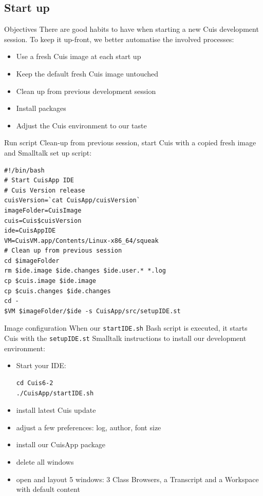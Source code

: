 \documentclass{beamer}
\begin{document}
\subsection{Start up }
\begin{frame}[fragile]{Objectives}
  There are good habits to have when starting a new Cuis development
  session. To keep it up-front, we better automatise the involved
  processes:

  \begin{itemize}
  \item Use a fresh Cuis image at each start up
  \item Keep the default fresh Cuis image untouched
  \item Clean up from previous development session
  \item Install packages
  \item Adjust the Cuis environment to our taste
  \end{itemize}
\end{frame}
%
\begin{frame}[fragile]{Run script}
  \fontsize{10pt}{12pt}\selectfont Clean-up from previous session,
  start Cuis with a copied fresh image and Smalltalk set up script:
  \begin{verbatim}
#!/bin/bash
# Start CuisApp IDE
# Cuis Version release
cuisVersion=`cat CuisApp/cuisVersion`
imageFolder=CuisImage
cuis=Cuis$cuisVersion
ide=CuisAppIDE
VM=CuisVM.app/Contents/Linux-x86_64/squeak
# Clean up from previous session
cd $imageFolder
rm $ide.image $ide.changes $ide.user.* *.log
cp $cuis.image $ide.image
cp $cuis.changes $ide.changes
cd -
$VM $imageFolder/$ide -s CuisApp/src/setupIDE.st
 \end{verbatim}
\end{frame}
%
\begin{frame}[fragile]{Image configuration}
  When our \texttt{startIDE.sh} Bash script is executed, it starts
  Cuis with the \texttt{setupIDE.st} Smalltalk instructions to install
  our development environment:
  \begin{itemize}
  \item Start your IDE:
\begin{verbatim}
cd Cuis6-2
./CuisApp/startIDE.sh
\end{verbatim}
  \item install latest Cuis update
  \item adjust a few preferences: log, author, font size
  \item install our CuisApp package
  \item delete all windows
  \item open and layout 5 windows: 3 Class Browsers, a Transcript and
    a Workspace with default content
  \end{itemize}
\end{frame}
\end{document}
